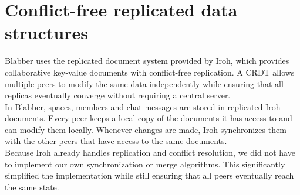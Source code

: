 \documentclass{article} %
\begin{document}
\section{Conflict-free replicated data structures}
Blabber uses the replicated document system provided by Iroh, which provides collaborative key-value documents with conflict-free replication. A CRDT allows multiple peers to modify the same data independently while ensuring that all replicas eventually converge without requiring a central server.
\\
In Blabber, spaces, members and chat messages are stored in replicated Iroh documents. Every peer keeps a local copy of the documents it has access to and can modify them locally. Whenever changes are made, Iroh synchronizes them with the other peers that have access to the same documents.
\\
Because Iroh already handles replication and conflict resolution, we did not have to implement our own synchronization or merge algorithms. This significantly simplified the implementation while still ensuring that all peers eventually reach the same state.
\end{document}
